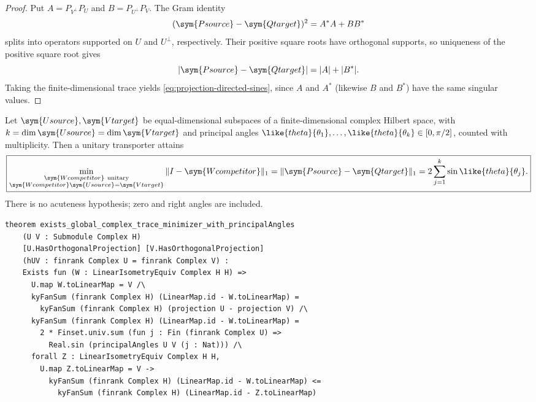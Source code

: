 \begin{proof}
Put $A=P_{V^\perp}P_U$ and $B=P_{U^\perp}P_V$. The Gram identity
\[
 (\sym{Psource}-\sym{Qtarget})^2=A^*A+BB^*
\]
splits into operators supported on $U$ and $U^\perp$, respectively.
Their positive square roots have orthogonal supports, so uniqueness of the
positive square root gives
\begin{equation}
 |\sym{Psource}-\sym{Qtarget}|=|A|+|B^*|.
 \label{eq:projection-modulus-split}
\end{equation}
Taking the finite-dimensional trace yields
\cref{eq:projection-directed-sines}, since $A$ and $A^*$ (likewise $B$
and $B^*$) have the same singular values.
\end{proof}

\begin{theorem}
\label{thm:complex-trace-all-pairs}
Let $\sym{Usource},\sym{Vtarget}$ be equal-dimensional subspaces of a finite-dimensional
complex Hilbert space, with $k=\dim\sym{Usource}=\dim\sym{Vtarget}$ and
principal angles $\like{theta}{\theta_1},\ldots,\like{theta}{\theta_k}\in[0,\pi/2]$,
counted with multiplicity. Then a unitary transporter attains
\begin{equation}
 \boxed{\displaystyle
 \min_{\substack{\sym{Wcompetitor}\ \mathrm{unitary}\\
                 \sym{Wcompetitor}\sym{Usource}=\sym{Vtarget}}}\|I-\sym{Wcompetitor}\|_1
 =\|\sym{Psource}-\sym{Qtarget}\|_1
 =2\sum_{j=1}^{k}\sin\like{theta}{\theta_j}.}
 \label{eq:complex-trace-optimum}
\end{equation}
There is no acuteness hypothesis; zero and right angles are included.
\end{theorem}

\begin{lstlisting}[style=leanpaper,
 caption={The principal-angle theorem's selected Lean declaration. The scalar
 field is written as \texttt{Complex}, and the unitary type as
 \texttt{LinearIsometryEquiv}; the displayed mathematical theorem gives the
 complete conclusion, including attainment and comparison with every competitor.},
 label={lst:complex-trace-optimum}]
theorem exists_global_complex_trace_minimizer_with_principalAngles
    (U V : Submodule Complex H)
    [U.HasOrthogonalProjection] [V.HasOrthogonalProjection]
    (hUV : finrank Complex U = finrank Complex V) :
    Exists fun (W : LinearIsometryEquiv Complex H H) =>
      U.map W.toLinearMap = V /\
      kyFanSum (finrank Complex H) (LinearMap.id - W.toLinearMap) =
        kyFanSum (finrank Complex H) (projection U - projection V) /\
      kyFanSum (finrank Complex H) (LinearMap.id - W.toLinearMap) =
        2 * Finset.univ.sum (fun j : Fin (finrank Complex U) =>
          Real.sin (principalAngles U V (j : Nat))) /\
      forall Z : LinearIsometryEquiv Complex H H,
        U.map Z.toLinearMap = V ->
          kyFanSum (finrank Complex H) (LinearMap.id - W.toLinearMap) <=
            kyFanSum (finrank Complex H) (LinearMap.id - Z.toLinearMap)
\end{lstlisting}

